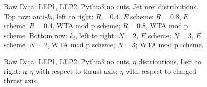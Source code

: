 \begin{figure}[H]
\hfill
\caption{Raw Data: LEP1, LEP2, Pythia8 no cuts. Jet nref distributions. Top row: anti-$k_t$, left to right: $R=0.4$, $E$ scheme; $R=0.8$, $E$ scheme; $R=0.4$, WTA mod p scheme; $R=0.8$, WTA mod p scheme. Bottom row: $k_t$, left to right: $N=2$, $E$ scheme; $N=3$, $E$ scheme; $N=2$, WTA mod p scheme; $N=3$; WTA mod p scheme.}  
\end{figure}

\begin{figure}[H]
\centering
{}\hfill
{}\hfill
{}\hfill
\caption{Raw Data: LEP1, LEP2, Pythia8 no cuts. $\eta$ distributions. Left to right: $\eta$; $\eta$ with respect to thrust axis; $\eta$ with respect to charged thrust axis.}
\end{figure}

